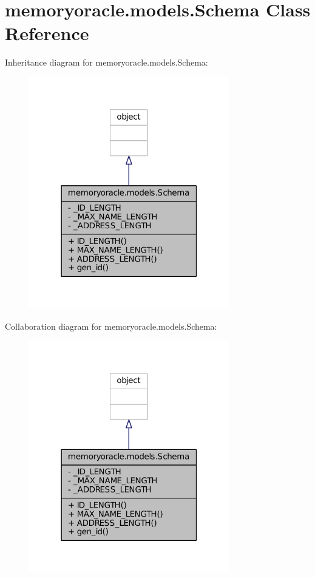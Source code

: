 \hypertarget{classmemoryoracle_1_1models_1_1Schema}{}\section{memoryoracle.\+models.\+Schema Class Reference}
\label{classmemoryoracle_1_1models_1_1Schema}


Inheritance diagram for memoryoracle.\+models.\+Schema\+:\nopagebreak
\begin{figure}[H]
\begin{center}
\leavevmode
\includegraphics[width=247pt]{classmemoryoracle_1_1models_1_1Schema__inherit__graph}
\end{center}
\end{figure}


Collaboration diagram for memoryoracle.\+models.\+Schema\+:\nopagebreak
\begin{figure}[H]
\begin{center}
\leavevmode
\includegraphics[width=247pt]{classmemoryoracle_1_1models_1_1Schema__coll__graph}
\end{center}
\end{figure}
